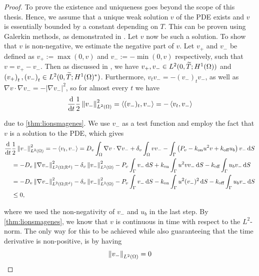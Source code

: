 \begin{proof}
    To prove the existence and uniqueness goes beyond the scope of this thesis. Hence, we assume that a unique weak solution $v$ of the PDE exists and $v$ is essentially bounded by a constant depending on $T$. This can be proven using Galerkin methods, as demonstrated in \cite{evans2010partial}. Let $v$ now be such a solution. To show that $v$ is non-negative, we estimate the negative part of $v$. Let $v_{+}$ and $v_{-}$ be defined as $v_+ := \max(0, v)$ and $v_- := - \min(0, v)$ respectively, such that $v = v_{+} - v_{-}$. Then as discussed in \cite{evans2010partial}, we have $v_{+}, v_{-} \in L^2(0, \widetilde{T}; H^1(\Omega))$ and $\left(v_{+}\right)_t, \left(v_{-}\right)_t \in L^2(0, \widetilde{T}; H^1(\Omega)^*)$. Furthermore, $v_t v_{-} = - (v_{-})_t v_{-}$, as well as $\nabla v \cdot \nabla v_{-} = - \left|\nabla v_{-}\right|^2$, so for almost every $t$ we have
%
    \begin{equation*}
         \frac{\mathop{}\!\mathrm{d}}{\mathop{}\!\mathrm{d} t} \frac12 \left\| v_{-} \right\|_{L^2(\Omega)}^2 = \left\langle (v_-)_t, v_- \right\rangle = - \left\langle v_t, v_{-} \right\rangle
    \end{equation*}

    \noindent
    due to \cref{thm:lionsmagenes}. We use $v_-$ as a test function and employ the fact that $v$ is a solution to the PDE, which gives
    \begin{equation*}
        \begin{aligned}
         \frac{\d}{\d t} &\frac12 \norm{v_{-}}_{\Ltwo{\Omega}}^2 = - \pair{v_t, v_{-}} = D_v \int_{\Omega} \nabla v \cdot \nabla v_- + \delta_v \int_{\Omega} v v_- - \int_{\Gamma} \left(P_v - \kon u^2 v + \koff u_b\right) v_-  \d S \\
        &= - D_v \norm{\nabla v_-}_{\Ltwo{\Omega; \R^d}}^2 - \delta_v \norm{v_-}_{\Ltwo{\Omega}}^2 - P_v \int_{\Gamma} v_- \d S + \kon \int_{\Gamma} u^2 v v_-  \d S - \koff \int_{\Gamma} u_b v_-  \d S \\
        &= - D_v \norm{\nabla v_-}_{\Ltwo{\Omega; \R^d}}^2 - \delta_v \norm{v_-}_{\Ltwo{\Omega}}^2 - P_v \int_{\Gamma} v_- \d S - \kon \int_{\Gamma} u^2 (v_-)^2  \d S - \koff \int_{\Gamma} u_b v_-  \d S \\
        &\leq 0,
    \end{aligned}
    \end{equation*}

    \noindent
    where we used the non-negativity of $v_-$ and $u_b$ in the last step. By \cref{thm:lionsmagenes}, we know that $v$ is continuous in time with respect to the $L^2$-norm. The only way for this to be achieved while also guaranteeing that the time derivative is non-positive, is by having
%
    \begin{equation*}
        \left\| v_{-} \right\|_{L^2(\Omega)} = 0
    \end{equation*}


\end{proof}
